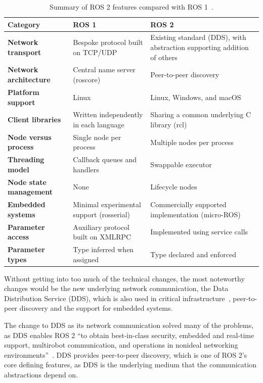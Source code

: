 \documentclass[a4paper]{book}
\begin{document}
\begin{table}[htbp]
	\centering
	\vspace{0.5em}
	\begin{tabularx}{\textwidth}{>{\bfseries}p{4.5cm} X X}
		\hline
		Category              & \textbf{ROS 1}                           & \textbf{ROS 2}                                                          \\
		\hline
		Network transport     & Bespoke protocol built on TCP/UDP        & Existing standard (DDS), with abstraction supporting addition of others \\[0.5em]
		Network architecture  & Central name server (roscore)            & Peer-to-peer discovery                                                  \\[0.5em]
		Platform support      & Linux                                    & Linux, Windows, and macOS                                               \\[0.5em]
		Client libraries      & Written independently in each language   & Sharing a common underlying C library (rcl)                             \\[0.5em]
		Node versus process   & Single node per process                  & Multiple nodes per process                                              \\[0.5em]
		Threading model       & Callback queues and handlers             & Swappable executor                                                      \\[0.5em]
		Node state management & None                                     & Lifecycle nodes                                                         \\[0.5em]
		Embedded systems      & Minimal experimental support (rosserial) & Commercially supported implementation (micro-ROS)                       \\[0.5em]
		Parameter access      & Auxiliary protocol built on XMLRPC       & Implemented using service calls                                         \\[0.5em]
		Parameter types       & Type inferred when assigned              & Type declared and enforced                                              \\
		\hline
	\end{tabularx}
	\caption{Summary of ROS 2 features compared with ROS
		1~\cite{macenski2022robot}.}
	\label{tab:ros1_vs_ros2}
\end{table}
Without getting into too much of the technical changes, the most noteworthy
changes would be the new underlying network communication, the Data Distribution
Service (DDS), which is also used in critical
infrastructure~\cite{macenski2022robot}, peer-to-peer discovery and the support
for embedded systems.
\par
The change to DDS as its network communication solved many of the problems, as
DDS enables ROS 2 \enquote{to obtain best-in-class security, embedded and
real-time support, multirobot communication, and operations in nonideal
networking environments}~\cite{macenski2022robot}. DDS provides peer-to-peer
discovery, which is one of ROS 2's core defining features, as DDS is the
underlying medium that the communication abstractions depend on.
\end{document}
